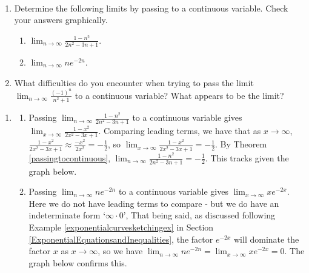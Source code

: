\documentclass{ximera}
\begin{document}
\begin{example}\label{limitofsequenceexample} $~$

 \begin{enumerate}  \item Determine the following limits by passing to a continuous variable.  Check your answers graphically.

\begin{enumerate}

\item  $\lim_{n \rightarrow \infty} \frac{1 - n^2}{2n^2-3n+1}$.

\item  $\lim_{n \rightarrow \infty} n e^{-2n}$.

\end{enumerate}


\item\label{squeezemotivation} What difficulties do you encounter when trying to pass the limit $\lim_{n \rightarrow \infty} \frac{(-1)^{n}}{n^2 +1}$ to a continuous variable?  What appears to be the limit?


\end{enumerate}

\begin{explanation} \begin{enumerate} \item  \begin{enumerate} \item Passing $\lim_{n \rightarrow \infty} \frac{1 - n^2}{2n^2-3n+1}$ to a continuous variable gives  $\lim_{x \rightarrow \infty}\frac{1 - x^2}{2x^2-3x+1}$.   Comparing leading terms, we have that as $x \rightarrow \infty$, $\frac{1 - x^2}{2x^2-3x+1} \approx \frac{-x^2}{2x^2} = -\frac{1}{2}$, so $\lim_{x \rightarrow \infty} \frac{1 - x^2}{2x^2-3x+1} = -\frac{1}{2}$.  By Theorem \ref{passingtocontinuous}, $\lim_{n \rightarrow \infty} \frac{1 - n^2}{2n^2-3n+1} = -\frac{1}{2}$.  This tracks given the graph below.

\begin{center}
\end{center}

\item Passing  $\lim_{n \rightarrow \infty} n e^{-2n}$ to a continuous variable gives  $\lim_{x \rightarrow \infty} x e^{-2x}$.  Here we do not have leading terms to compare - but we do have an indeterminate form `$\infty \cdot 0$',  That being said, as discussed following Example \ref{exponentialcurvesketchingex} in Section \ref{ExponentialEquationsandInequalities}, the factor $e^{-2x}$ will dominate the factor $x$ as $x \rightarrow \infty$, so we have  $\lim_{n \rightarrow \infty} n e^{-2n} = \lim_{x \rightarrow \infty} x e^{-2x} = 0$.  The graph below confirms this.


\end{enumerate}
\end{enumerate}
\end{explanation}
\end{example}
\end{document}
